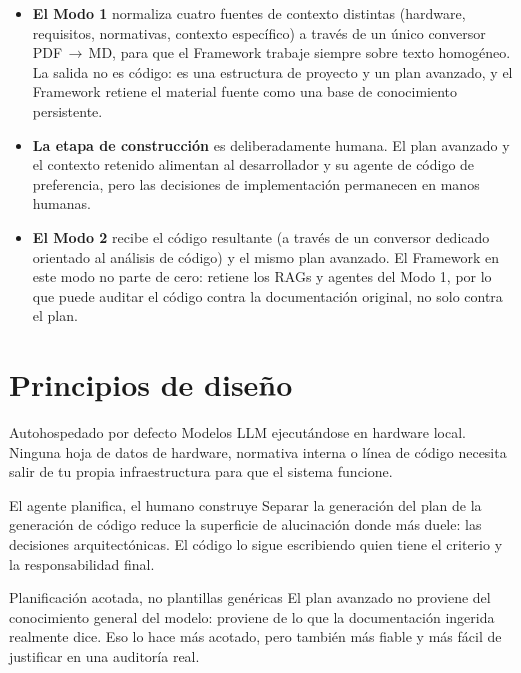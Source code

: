 \documentclass[11pt]{article}
\begin{document}
\begin{itemize}
  \item \textbf{El Modo 1} normaliza cuatro fuentes de contexto distintas (hardware, requisitos, normativas, contexto específico) a través de un único conversor PDF\,\(\to\)\,MD, para que el Framework trabaje siempre sobre texto homogéneo. La salida no es código: es una estructura de proyecto y un plan avanzado, y el Framework retiene el material fuente como una base de conocimiento persistente.
  \item \textbf{La etapa de construcción} es deliberadamente humana. El plan avanzado y el contexto retenido alimentan al desarrollador y su agente de código de preferencia, pero las decisiones de implementación permanecen en manos humanas.
  \item \textbf{El Modo 2} recibe el código resultante (a través de un conversor dedicado orientado al análisis de código) y el mismo plan avanzado. El Framework en este modo no parte de cero: retiene los RAGs y agentes del Modo 1, por lo que puede auditar el código contra la documentación original, no solo contra el plan.
\end{itemize}

\section{Principios de diseño}

\begin{ideabox}{Autohospedado por defecto}
Modelos LLM ejecutándose en hardware local. Ninguna hoja de datos de hardware, normativa interna o línea de código necesita salir de tu propia infraestructura para que el sistema funcione.
\end{ideabox}

\vspace{0.4em}

\begin{ideabox}{El agente planifica, el humano construye}
Separar la generación del plan de la generación de código reduce la superficie de alucinación donde más duele: las decisiones arquitectónicas. El código lo sigue escribiendo quien tiene el criterio y la responsabilidad final.
\end{ideabox}

\vspace{0.4em}

\begin{ideabox}{Planificación acotada, no plantillas genéricas}
El plan avanzado no proviene del conocimiento general del modelo: proviene de lo que la documentación ingerida realmente dice. Eso lo hace más acotado, pero también más fiable y más fácil de justificar en una auditoría real.
\end{ideabox}
\end{document}
